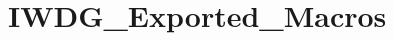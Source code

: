 \hypertarget{group__IWDG__Exported__Macros}{
\section{IWDG\_\-Exported\_\-Macros}
\label{group__IWDG__Exported__Macros}
}
